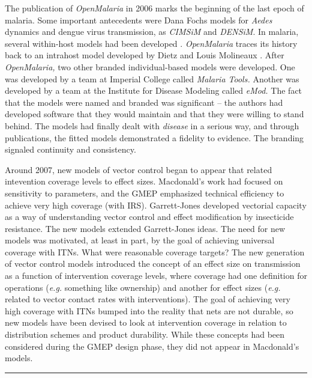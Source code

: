 \documentclass[
]{book}
\begin{document}
The publication of \emph{OpenMalaria} in 2006 marks the beginning of the last epoch of malaria. Some important antecedents were Dana Fochs models for \emph{Aedes} dynamics and dengue virus transmission, as \emph{CIMSiM} and \emph{DENSiM}. In malaria, several within-host models had been developed \autocite{MolineauxL1999ReviewIntrahost,MolineauxL2001PlasmodiumFalciparum}. \emph{OpenMalaria} traces its history back to an intrahost model developed by Dietz and Louis Molineaux \autocite{MolineauxL2001PlasmodiumFalciparum}. After \emph{OpenMalaria,} two other branded individual-based models were developed. One was developed by a team at Imperial College called \emph{Malaria Tools.} Another was developed by a team at the Institute for Disease Modeling called \emph{eMod.} The fact that the models were named and branded was significant -- the authors had developed software that they would maintain and that they were willing to stand behind. The models had finally dealt with \emph{disease} in a serious way, and through publications, the fitted models demonstrated a fidelity to evidence. The branding signaled continuity and consistency.

Around 2007, new models of vector control began to appear that related intevention coverage levels to effect sizes. Macdonald's work had focused on sensitivity to parameters, and the GMEP emphasized technical efficiency to achieve very high coverage (with IRS). Garrett-Jones developed vectorial capacity as a way of understanding vector control and effect modification by insecticide resistance. The new models extended Garrett-Jones ideas. The need for new models was motivated, at least in part, by the goal of achieving universal coverage with ITNs. What were reasonable coverage targets? The new generation of vector control models introduced the concept of an effect size on transmission as a function of intervention coverage levels, where coverage had one definition for operations (\emph{e.g.} something like ownership) and another for effect sizes (\emph{e.g.} related to vector contact rates with interventions). The goal of achieving very high coverage with ITNs bumped into the reality that nets are not durable, so new models have been devised to look at intervention coverage in relation to distribution schemes and product durability. While these concepts had been considered during the GMEP design phase, they did not appear in Macdonald's models.

\begin{center}\rule{0.5\linewidth}{0.5pt}\end{center}
\end{document}
